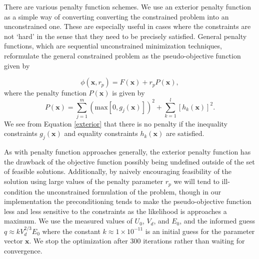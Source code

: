 \documentclass[12pt,a4paper,oneside]{book}
\begin{document}
There are various penalty function schemes. We use an exterior penalty function as a simple way of converting converting the constrained problem into an unconstrained one. These are especially useful in cases where the constraints are not `hard' in the sense that they need to be precisely satisfied. General penalty functions, which are sequential unconstrained minimization techniques, reformulate the general constrained problem as the pseudo-objective function given by

\[ \phi(\mathbf{x}, r_p ) = F(\mathbf{x}) + r_p P(\mathbf{x}), \]
where the penalty function $P \left( \mathbf{x} \right)$ is given by
\begin{equation} \label{exterior}
 P( \mathbf{x} ) = \sum_{j = 1}^m \left( \mbox{max} \left[ 0, g_j(\mathbf{x} ) \right] \right)^2 + 
\sum_{k = 1}^l \left[ h_k( \mathbf{x}) \right]^2 .
\end{equation}
We see from Equation \ref{exterior} that there is no penalty if the inequality constraints $g_j(\mathbf{x})$ and equality constraints $h_k(\mathbf{x})$ are satisfied.
 
As with penalty function approaches generally, the exterior penalty function has the drawback of the objective function possibly being undefined outside of the set of feasible solutions. Additionally, by naively encouraging feasibility of the solution using large values of the penalty parameter $r_p$ we will tend to ill-condition the unconstrained formulation of the problem, though in our implementation the preconditioning tends to make the pseudo-objective function less and less sensitive to the constraints as the likelihood is approaches a maximum. We use the measured values of $U_0$, $V_d$, and $E_0$, and the informed guess $q \approx k V_d^{2/3} E_0$ where the constant $k \approx 1 \times 10^{-11}$ is an initial guess for the parameter vector $\mathbf{x}$. We stop the optimization after 300 iterations rather than waiting for convergence.
\end{document}
